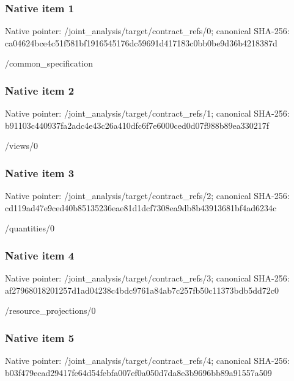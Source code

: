 \documentclass[10pt,a4paper]{article}
\begin{document}
\subsubsection{Native item 1}
Native pointer: /joint\_\allowbreak{}analysis/target/contract\_\allowbreak{}refs/0; canonical SHA-256: ca04624bce4c51f581bf1916545176dc59691d417183c0bb0be9d36b4218387d

\begingroup\raggedright\sloppy /\allowbreak{}common\_\allowbreak{}specification\par\endgroup

\subsubsection{Native item 2}
Native pointer: /joint\_\allowbreak{}analysis/target/contract\_\allowbreak{}refs/1; canonical SHA-256: b91103c440937fa2adc4e43c26a410dfc6f7e6000ced0d07f988b89ea330217f

\begingroup\raggedright\sloppy /\allowbreak{}views/\allowbreak{}0\par\endgroup

\subsubsection{Native item 3}
Native pointer: /joint\_\allowbreak{}analysis/target/contract\_\allowbreak{}refs/2; canonical SHA-256: cd119ad47e9ced40b85135236eae81d1dcf7308ea9db8b43913681bf4ad6234c

\begingroup\raggedright\sloppy /\allowbreak{}quantities/\allowbreak{}0\par\endgroup

\subsubsection{Native item 4}
Native pointer: /joint\_\allowbreak{}analysis/target/contract\_\allowbreak{}refs/3; canonical SHA-256: af27968018201257d1ad04238c4bdc9761a84ab7c257fb50c11373bdb5dd72c0

\begingroup\raggedright\sloppy /\allowbreak{}resource\_\allowbreak{}projections/\allowbreak{}0\par\endgroup

\subsubsection{Native item 5}
Native pointer: /joint\_\allowbreak{}analysis/target/contract\_\allowbreak{}refs/4; canonical SHA-256: b03f479ecad29417fe64d54febfa007ef0a050d7da8e3b9696bb89a91557a509
\end{document}

